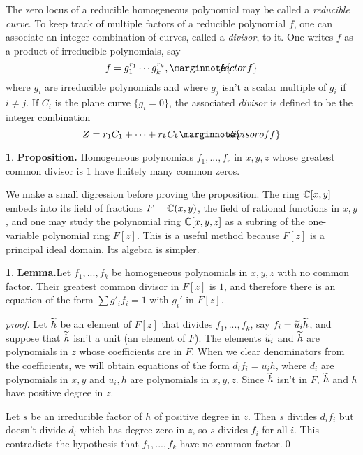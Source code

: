 \documentclass[leqno]{book}
\newcommand\Marginnote[1]{\marginnote{\hspace{-12pt}\normalfont{#1}}}
\theoremstyle{definition}%
\numberwithin{equation}{section}
\theoremstyle{theorem} %
\newtheorem{lemma}[equation]{}
\newtheorem{proposition}[equation]{}
\renewenvironment{proof}{\no \emph{proof.}}{}
\begin{document}
\ms The zero locus of a reducible homogeneous polynomial may be
called a {\it reducible curve}.  To keep track of multiple factors of
a reducible polynomial $f$, one can associate an integer combination of curves, called a
{\it divisor}, to it.  One writes $f$ as a product
of irreducible polynomials, say
\begin{equation}f= g_1^{r_1}\cdots g_k^{r_k},
\Marginnote{factorf}\label{factorf}\end{equation} 
where $g_i$
are irreducible polynomials and where $g_j$ 
isn't a scalar
multiple of $g_i$ if $i\neq j$. If $C_i$ is the plane curve
$\{g_i=0\}$, the associated {\it divisor} is defined to be the
integer combination
\begin{equation} Z = r_1C_1 + \cdots + r_kC_k
\Marginnote{divisoroff}\label{divisoroff}
\end{equation}


\begin{proposition}{\bf Proposition.}
\label{fgzerofinite} Homogeneous polynomials
$f_1,...,f_r$ in $x,y,z$ whose greatest common divisor is $1$ have
 finitely many common zeros.\end{proposition}

We make a small digression before proving the proposition.  
The ring $\mathbb{C}[x,y]$ embeds into its field of fractions $F= \mathbb{C}(x,y)$, the
field of rational functions in $x,y$, and one may study the polynomial
ring $\mathbb{C}[x,y,z]$ as a subring of the one-variable polynomial ring
$F[z]$.  This is a useful method because $F[z]$ is a principal ideal
domain.  Its algebra is simpler.

\begin{lemma}{\bf Lemma.}\label{relprime}
Let $f_1,...,f_k$ be homogeneous polynomials in $x,y,z$ with no common
factor.  Their greatest common divisor in $F[z]$ is $1$, and
therefore there is an equation of the form $\sum g'_if_i=1$ with
$g_i'$ in $F[z]$.\end{lemma}

\begin{proof}
Let $\widetilde h$ be an element of $F[z]$ that divides $f_1,...,f_k$, say
$f_i = \widetilde u_i\widetilde h$, and suppose that $\widetilde h$ isn't a unit (an element
of $F$).  The elements $\widetilde u_i$ and $\widetilde h$ are polynomials in $z$
whose coefficients are in $F$.  When we clear denominators from the
coefficients, we will obtain equations of the form $d_if_i = u_ih$,
where $d_i$ are polynomials in $x,y$ and $u_i,h$ are polynomials in
$x,y,z$.  Since $\widetilde h$ isn't in $F$, $\widetilde h$ and $h$ have positive
degree in $z$.  

Let $s$ be an irreducible factor of $h$ of positive degree in
$z$. Then $s$ divides $d_if_i$ but doesn't divide $d_i$ which has
degree zero in $z$, so $s$ divides $f_i$ for all $i$.  This
contradicts the hypothesis that $f_1,...,f_k$ have no common
factor.\qed\end{proof}
\end{document}
